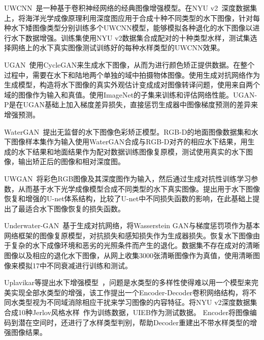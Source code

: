 UWCNN~\cite{anwar2018deep}是一种基于卷积神经网络的经典图像增强模型。在NYU v2~\cite{Silberman:ECCV12}深度数据集上，将海洋光学成像原理利用深度图应用于合成十种不同类型的水下图像，针对每种水下矮图像类型分别训练多个UWCNN模型，能够模拟各种退化的水下图像以进行水下数据增强。训练集使用NYU v2数据集合成配对的十种类型水样，测试集选择网络上的水下真实图像测试训练好的每种水样类型的UWCNN效果。

UGAN~\cite{fabbri2018enhancing}使用CycleGAN来生成水下图像，从而为进行颜色矫正提供数据。在整个过程中，需要在水下和陆地两个单独的域中拍摄物体图像。使用生成对抗网络作为生成模型，构造将水下图像的真实外观估计变成成对图像转译问题，使用来自两个域的图像作为输入和真值。使用ImageNet的子集来训练和评估网络性能。UGAN-P是在UGAN基础上加入梯度差异损失，直接惩罚生成器中图像梯度预测的差异来增强预测。

WaterGAN~\cite{li2017watergan}提出无监督的水下图像色彩矫正模型。RGB-D的地面图像数据集和水下图像样本集作为输入使用WaterGAN合成与RGB-D对齐的相应水下结果，用生成的水下结果和地面结果作为配对数据训练图像复原模，测试使用真实的水下图像，输出矫正后的图像和相对深度图。

UWGAN~\cite{wang2019uwgan}将彩色RGB图像及其深度图作为输入，然后通过生成对抗性训练学习参数，从而基于水下光学成像模型合成不同类型的水下真实图像。提出用于水下图像恢复和增强的U-net体系结构，比较了U-net中不同损失函数的影响，在此基础上提出了最适合水下图像恢复的损失函数。

Underwater-GAN~\cite{yu2018underwater}基于生成对抗网络，将Wasserstein GAN与梯度惩罚项作为基本网络框架的图像复原模型，对抗损失和感知损失作为生成器损失。恢复水下图像由于复杂的水下成像环境和恶劣的光照条件而产生的退化。数据集不存在成对的清晰图像以及相应的退化水下图像，从网上收集3000张清晰图像作为真值，使用清晰图像来模拟17中不同衰减进行训练和测试。


Uplavikar等提出水下增强模型~\cite{uplavikar2019all}，问题是水类型的多样性使得难以用一个模型来完美实现全部水类型的增强，该工作提出一个Encoder-Decoder卷积网络结构，将不同水类型视为不同域消除相应干扰来学习图像的内容特征。将NYU v2深度数据集合成10种Jerlov风格水样~\cite{anwar2018deep}作为训练数据，UIEB作为测试数据。%
Encoder将图像编码到潜在空间时，还进行了水样类型判别，帮助Decoder重建出不带水样类型的增强图像结果。

